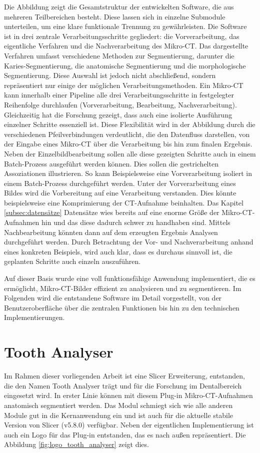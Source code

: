 Die Abbildung zeigt die Gesamtstruktur der entwickelten Software, die aus mehreren
Teilbereichen besteht. Diese lassen sich in einzelne Submodule unterteilen, um eine
klare funktionale Trennung zu gewährleisten. Die Software ist in drei zentrale
Verarbeitungsschritte gegliedert: die Vorverarbeitung, das eigentliche Verfahren
und die Nachverarbeitung des Mikro-\ac{CT}. Das dargestellte Verfahren umfasst verschiedene
Methoden zur Segmentierung, darunter die Karies-Segmentierung, die anatomische Segmentierung
und die morphologische Segmentierung. Diese Auswahl ist jedoch nicht
abschließend, sondern repräsentiert nur einige der möglichen Verarbeitungsmethoden.
Ein Mikro-\ac{CT} kann innerhalb einer Pipeline alle drei Verarbeitungsschritte in
festgelegter Reihenfolge durchlaufen (Vorverarbeitung, Bearbeitung, Nachverarbeitung).
Gleichzeitig hat die Forschung gezeigt, dass auch eine isolierte Ausführung
einzelner Schritte essenziell ist. Diese Flexibilität wird in der Abbildung durch
die verschiedenen Pfeilverbindungen verdeutlicht, die den Datenfluss darstellen,
von der Eingabe eines Mikro-\ac{CT} über die Verarbeitung bis hin zum finalen Ergebnis.
Neben der Einzelbildbearbeitung sollen alle diese gezeigten Schritte auch in
einem Batch-Prozess ausgeführt werden können. Dies sollen die gestrichelten Assoziationen
illustrieren. So kann Beispielsweise eine Vorverarbeitung isoliert in einem
Batch-Prozess durchgeführt werden. Unter der Vorverarbeitung eines Bildes wird die
Vorbereitung auf eine Verarbeitung verstanden. Dies könnte beispielsweise eine
Komprimierung der \ac{CT}-Aufnahme beinhalten. Das Kapitel \ref{subsec:datensätze} Datensätze
wies bereits auf eine enorme Größe der Mikro-\ac{CT}-Aufnahmen hin und das diese dadurch
schwer zu handhaben sind. Mittels Nachbearbeitung könnten dann auf dem erzeugten
Ergebnis Analysen durchgeführt werden. Durch Betrachtung der Vor- und
Nachverarbeitung anhand eines konkreten Beispiels, wird auch klar, dass es
durchaus sinnvoll ist, die geplanten Schritte auch einzeln auszuführen.

Auf dieser Basis wurde eine voll funktionsfähige Anwendung implementiert, die es
ermöglicht, Mikro-\ac{CT}-Bilder effizient zu analysieren und zu segmentieren. Im
Folgenden wird die entstandene Software im Detail vorgestellt, von der Benutzeroberfläche
über die zentralen Funktionen bis hin zu den technischen Implementierungen.

\section{Tooth Analyser}
\label{sec:tooth_analyser} Im Rahmen dieser vorliegenden Arbeit ist eine Slicer Erweiterung,
entstanden, die den Namen Tooth Analyser trägt und für die Forschung im Dentalbereich
eingesetzt wird. In erster Linie können mit diesem Plug-in Mikro-\ac{CT}-Aufnahmen
anatomisch segmentiert werden. Das Modul schmiegt sich wie alle anderen Module
gut in die Kernanwendung ein und ist auch für die aktuelle stabile Version von
Slicer (v5.8.0) verfügbar. Neben der eigentlichen Implementierung ist auch ein Logo
für das Plug-in entstanden, das es nach außen repräsentiert. Die Abbildung \ref{fig:logo_tooth_analyser}
zeigt dies.

